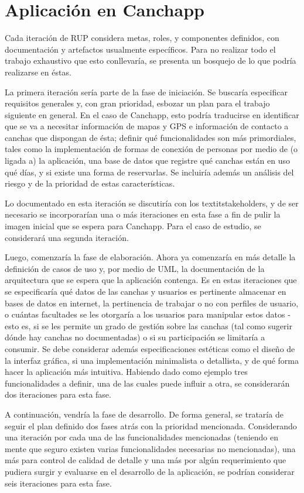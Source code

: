 \documentclass[spanish]{udpreport}
\begin{document}
\chapter{Aplicación en Canchapp}
Cada iteración de RUP considera metas, roles, y componentes definidos, con documentación y artefactos usualmente específicos. Para no realizar todo el trabajo exhaustivo que esto conllevaría, se presenta un bosquejo de lo que podría realizarse en éstas.\par
La primera iteración sería parte de la fase de iniciación. Se buscaría especificar requisitos generales y, con gran prioridad, esbozar un plan para el trabajo siguiente en general. En el caso de Canchapp, esto podría traducirse en identificar que se va a necesitar información de mapas y GPS e información de contacto a canchas que dispongan de ésta; definir qué funcionalidades son más primordiales, tales como la implementación de formas de conexión de personas por medio de (o ligada a) la aplicación, una base de datos que registre qué canchas están en uso qué días, y si existe una forma de reservarlas. Se incluiría además un análisis del riesgo y de la prioridad de estas características.\par
Lo documentado en esta iteración se discutiría con los textit{stakeholders}, y de ser necesario se incorporarían una o más iteraciones en esta fase a fin de pulir la imagen inicial que se espera para Canchapp. Para el caso de estudio, se considerará una segunda iteración.\par
Luego, comenzaría la fase de elaboración. Ahora ya comenzaría en más detalle la definición de casos de uso y, por medio de UML, la documentación de la arquitectura que se espera que la aplicación contenga. Es en estas iteraciones que se especificaría qué datos de las canchas y usuarios es pertinente almacenar en bases de datos en internet, la pertinencia de trabajar o no con perfiles de usuario, o cuántas facultades se les otorgaría a los usuarios para manipular estos datos -esto es, si se les permite un grado de gestión sobre las canchas (tal como sugerir dónde hay canchas no documentadas) o si su participación se limitaría a consumir. Se debe considerar además especificaciones estéticas como el diseño de la interfaz gráfica, si una implementación minimalista o detallista, y de qué forma hacer la aplicación más intuitiva. Habiendo dado como ejemplo tres funcionalidades a definir, una de las cuales puede influir a otra, se considerarán dos iteraciones para esta fase.\par
A continuación, vendría la fase de desarrollo. De forma general, se trataría de seguir el plan definido dos fases atrás con la prioridad mencionada. Considerando una iteración por cada una de las funcionalidades mencionadas (teniendo en mente que seguro existen varias funcionalidades necesarias no mencionadas), una más para control de calidad de detalle y una más por algún requerimiento que pudiera surgir y evaluarse en el desarrollo de la aplicación, se podrían considerar seis iteraciones para esta fase.\par
\end{document}
